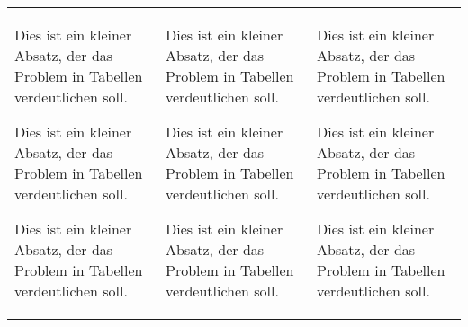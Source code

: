 \documentclass[parskip]{scrartcl}
\begin{document}
\begin{tabularx}{\linewidth}{P{4cm}R{4cm}X}
Dies ist ein kleiner Absatz, der das Problem in Tabellen verdeutlichen
soll.\par
Dies ist ein kleiner Absatz, der das Problem in Tabellen verdeutlichen
soll.\par
Dies ist ein kleiner Absatz, der das Problem in Tabellen verdeutlichen soll.
&
Dies ist ein kleiner Absatz, der das Problem in Tabellen verdeutlichen
soll.\par
Dies ist ein kleiner Absatz, der das Problem in Tabellen verdeutlichen
soll.\par
Dies ist ein kleiner Absatz, der das Problem in Tabellen verdeutlichen soll.
&
Dies ist ein kleiner Absatz, der das Problem in Tabellen verdeutlichen
soll.\par
Dies ist ein kleiner Absatz, der das Problem in Tabellen verdeutlichen
soll.\par
Dies ist ein kleiner Absatz, der das Problem in Tabellen verdeutlichen soll.
\end{tabularx}
\end{document}

